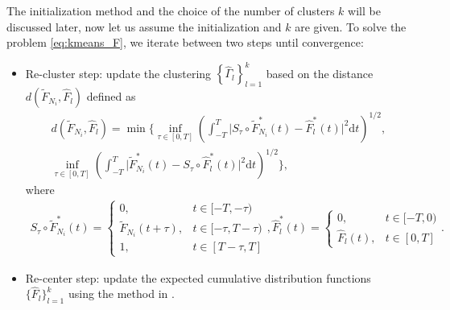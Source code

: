 		The initialization method and the choice of the number of clusters $k$ will be discussed later, now let us assume the initialization and $k$ are given.
		To solve the problem \eqref{eq:kmeans_F}, we iterate between two steps until convergence:
			\begin{itemize}
				\item Re-cluster step: update the clustering 
				$\left\{ \hat\Gamma_l \right\}_{l=1}^k$ based on the distance $d(\tilde{F}_{N_i}, \hat F_l)$ 
				defined as 
				\begin{align*}
				 d(\tilde{F}_{N_i}, \hat F_l) = \min\Big\{ \inf_{\tau\in[0,T]}\left( \int_{-T}^T\big| S_\tau\circ\tilde{F}^*_{N_i}(t)-\hat F_{l}^*(t) \big|^2 \text{d}t \right)^{1/2}, \\
				 \inf_{\tau\in[0,T]}\left( \int_{-T}^T\big| \tilde{F}^*_{N_i}(t)-S_\tau\circ\hat F_{l}^*(t) \big|^2 \text{d}t \right)^{1/2} \Big\},
				\end{align*}
				where
				\begin{align}\label{eq:def of shifted curve}
				S_\tau\circ\tilde{F}^*_{N_i}(t)=
				\begin{cases}
				0, &t\in[-T,-\tau)\\
				\tilde F_{N_i}(t+ \tau), &t\in[-\tau,T-\tau)\\
				1,& t\in [T-\tau,T]
				\end{cases},
				\hat F_{l}^*(t)=
				\begin{cases}
				0, &t\in[-T,0)\\
				\hat F_{l}(t), &t\in [0,T]
				\end{cases}.
				\end{align}
				
				
				\item Re-center step: update the expected cumulative distribution functions $\{\hat F_l\}_{l=1}^k$ using the method in \citet{Bigot2013}.

			\end{itemize}

